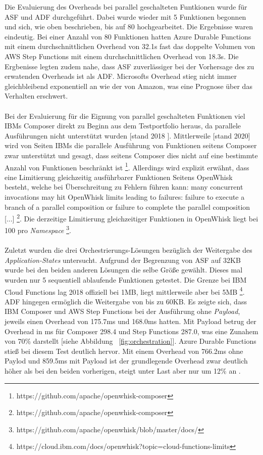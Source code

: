 \documentclass[11pt]{article}
\begin{document}
Die Evaluierung des Overheads bei parallel geschalteten Funtkionen wurde für ASF und ADF durchgeführt. Dabei wurde wieder mit 5 Funktionen begonnen und sich, wie oben beschrieben, bis auf 80 hochgearbeitet. Die Ergebnisse waren eindeutig. Bei einer Anzahl von 80 Funktionen hatten Azure Durable Functions mit einem durchschnittlichen Overhead von 32.1s fast das doppelte Volumen von AWS Step Functions mit einem durchschnittlichen Overhead von 18.3s. Die Ergbenisse legten zudem nahe, dass ASF zuverlässiger bei der Vorhersage des zu erwatenden Overheads ist als ADF. Microsofts Overhead stieg nicht immer gleichbleibend exponentiell an wie der von Amazon, was eine Prognose über das Verhalten erschwert.\\\\
Bei der Evaluierung für die Eignung von parallel geschalteten Funktionen viel IBMs Composer direkt zu Beginn aus dem Testportfolio heraus, da parallele Ausführungen nicht unterstützt wurden [stand 2018 \cite{lopez2018comparison}]. Mittlerweile [stand 2020] wird von Seiten IBMs die parallele Ausführung von Funktionen seitens Composer zwar unterstützt und gesagt, dass seitens Composer dies nicht auf eine bestimmte Anzahl von Funktionen beschränkt ist \footnote{https://github.com/apache/openwhisk-composer}. Allerdings wird explizit erwähnt, dass eine Limitierung gleichzeitig ausführbarer Funktionen Seitens OpenWhisk besteht, welche bei Überschreitung zu Fehlern führen kann: \glqq [...] many concurrent invocations may hit OpenWhisk limits leading to failures: failure to execute a branch of a parallel composition or failure to complete the parallel composition [...]\grqq{} \footnote{https://github.com/apache/openwhisk-composer}. Die derzeitige Limitierung gleichzeitiger Funktionen in OpenWhisk liegt bei 100 pro \textit{Namespace} \footnote{https://github.com/apache/openwhisk/blob/master/docs/}. \\\\
Zuletzt wurden die drei Orchestrierungs-Lösungen bezüglich der Weitergabe des \textit{Application-States} untersucht. Aufgrund der Begrenzung von ASF auf 32KB wurde bei den beiden anderen Lösungen die selbe Größe gewählt. Dieses mal wurden nur 5 sequentiell ablaufende Funktionen getestet. Die Grenze bei IBM Cloud Functions lag 2018 offiziell bei 1MB, liegt mittlerweile aber bei 5MB \footnote{https://cloud.ibm.com/docs/openwhisk?topic=cloud-functions-limits}. ADF hingegen ermöglich die Weitergabe von bis zu 60KB. Es zeigte sich, dass IBM Composer und AWS Step Functions bei der Ausführung ohne \textit{Payload}, jeweils einen Overhead von 175.7ms und 168.0ms hatten. Mit Payload betrug der Overhead in ms für Composer 298.4 und Step Functions 287.0, was eine Zunahem von 70\% darstellt [siehe Abbildung ~\ref{fig:orchestration}]. Azure Durable Functions stieß bei diesem Test deutlich hervor. Mit einem Overhead von 766.2ms ohne Paylod und 859.5ms mit Payload ist der grundlegende Overhead zwar deutlich höher als bei den beiden vorherigen, steigt unter Last aber nur um 12\% an \cite{lopez2018comparison}.
\end{document}
